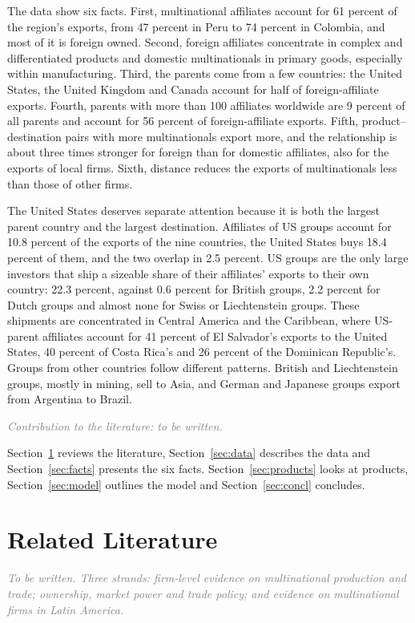 \documentclass[11pt,a4paper]{article}
\newcommand{\tbw}[1]{\textcolor{gray}{\textit{#1}}}
\begin{document}
The data show six facts. First, multinational affiliates account for 61 percent of the region's
exports, from 47 percent in Peru to 74 percent in Colombia, and most of it is foreign owned.
Second, foreign affiliates concentrate in complex and differentiated products and domestic
multinationals in primary goods, especially within manufacturing. Third, the parents come from a
few countries: the United States, the United Kingdom and Canada account for half of
foreign-affiliate exports. Fourth, parents with more than 100 affiliates worldwide are 9 percent of
all parents and account for 56 percent of foreign-affiliate exports. Fifth, product--destination
pairs with more multinationals export more, and the relationship is about three times stronger for
foreign than for domestic affiliates, also for the exports of local firms. Sixth, distance reduces
the exports of multinationals less than those of other firms.

The United States deserves separate attention because it is both the largest parent country and
the largest destination. Affiliates of US groups account for 10.8 percent of the exports of the
nine countries, the United States buys 18.4 percent of them, and the two overlap in 2.5 percent.
US groups are the only large investors that ship a sizeable share of their affiliates' exports to
their own country: 22.3 percent, against 0.6 percent for British groups, 2.2 percent for Dutch
groups and almost none for Swiss or Liechtenstein groups. These shipments are concentrated in
Central America and the Caribbean, where US-parent affiliates account for 41 percent of El
Salvador's exports to the United States, 40 percent of Costa Rica's and 26 percent of the
Dominican Republic's. Groups from other countries follow different patterns. British and
Liechtenstein groups, mostly in mining, sell to Asia, and German and Japanese groups export from
Argentina to Brazil.

\tbw{Contribution to the literature: to be written.}

Section~\ref{sec:lit} reviews the literature, Section~\ref{sec:data} describes the data and
Section~\ref{sec:facts} presents the six facts. Section~\ref{sec:products} looks at products,
Section~\ref{sec:model} outlines the model and Section~\ref{sec:concl} concludes.


\section{Related Literature}\label{sec:lit}
\tbw{To be written. Three strands: firm-level evidence on multinational production and trade;
ownership, market power and trade policy; and evidence on multinational firms in Latin America.}
\end{document}
